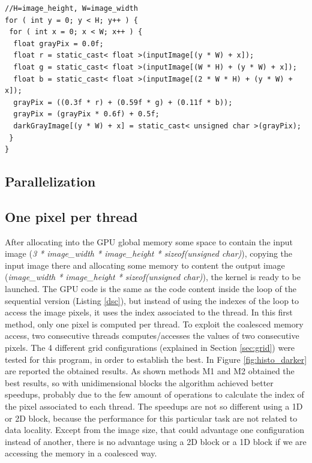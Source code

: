 \documentclass[a4paper]{article}
\begin{document}
\begin{lstlisting}[label=dsc, caption=Darker Sequential code]
//H=image_height, W=image_width
for ( int y = 0; y < H; y++ ) {
 for ( int x = 0; x < W; x++ ) {
  float grayPix = 0.0f;
  float r = static_cast< float >(inputImage[(y * W) + x]);
  float g = static_cast< float >(inputImage[(W * H) + (y * W) + x]);
  float b = static_cast< float >(inputImage[(2 * W * H) + (y * W) + x]);
  grayPix = ((0.3f * r) + (0.59f * g) + (0.11f * b));
  grayPix = (grayPix * 0.6f) + 0.5f;
  darkGrayImage[(y * W) + x] = static_cast< unsigned char >(grayPix);
 }
}
\end{lstlisting}
\FloatBarrier

\subsection{Parallelization}
\label{sec:p1}
\subsection{{One pixel per thread}}
\label{sec:dfm}
After allocating into the GPU global memory some space to contain the input image (\textit{3 * image\_width * image\_height * sizeof(unsigned char)}), copying the input image there and allocating some memory to content the output image (\textit{image\_width * image\_height * sizeof(unsigned char)}), the kernel is ready to be launched. The GPU code is the same as the code content inside the loop of the sequential version (Listing \ref{dsc}), but instead of using the indexes of the loop to access the image pixels, it uses the index associated to the thread. In this first method, only one pixel is computed per thread. To exploit the coalesced memory access, two consecutive threads computes/accesses the values of two consecutive pixels. The 4 different grid configurations (explained in Section \ref{sec:grid}) were tested for this program, in order to establish the best. In Figure \ref{fig:histo_darker} are reported the obtained results. As shown methods M1 and M2 obtained the best results, so with unidimensional blocks the algorithm achieved better speedups, probably due to the few amount of operations to calculate the index of the pixel associated to each thread. The speedups are not so different using a 1D or 2D block, because the performance for this particular task are not related to data locality. Except from the image size, that could advantage one configuration instead of another, there is no advantage using a 2D block or a 1D block if we are accessing the memory in a coalesced way.
\end{document}
